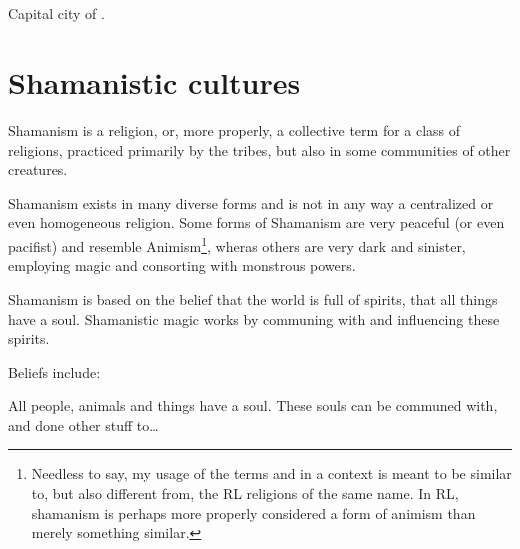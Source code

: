 \subsection[Pylandos]{\Pylandos}
\index{\Pylandos}
Capital city of \Scyrum. 















\section{Shamanistic cultures}
Shamanism is a religion, or, more properly, a collective term for a class of religions, practiced primarily by the \meccaran{} tribes, but also in some communities of other creatures. %

Shamanism exists in many diverse forms and is not in any way a centralized or even homogeneous religion. Some forms of Shamanism are very peaceful (or even pacifist) and resemble Animism\footnote{Needless to say, my usage of the terms  and  in a \Miithian{} context is meant to be similar to, but also different from, the RL religions of the same name. In RL, shamanism is perhaps more properly considered a form of animism than merely something similar.}, wheras others are very dark and sinister, employing  magic and consorting with monstrous powers. 

Shamanism is based on the belief that the world is full of spirits, that all things have a soul. Shamanistic magic works by communing with and influencing these spirits. 

Beliefs include: 

All people, animals and things have a soul. These souls can be communed with, and done other stuff to\ldots{} 


